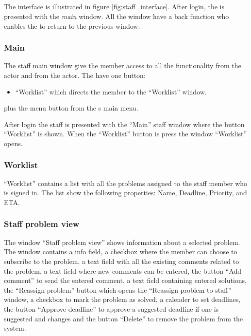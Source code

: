 
\subsection{\sinterface}
The \astaff interface is illustrated in figure \ref{fig:staff_interface}.
After login, the \astaff[] is presented with the \textit{main} window. All the window have a back function who enables the \astaff[] to return to the previous window.


\subsubsection{Main}
The staff main window give the \astaff member access to all the functionality from the \astaff actor and from the \aclient actor. The \astaff have one button:
\begin{itemize}
	\item ``Worklist'' which directs the \astaff member to the ``Worklist'' window. 
\end{itemize}   
plus the menu button from the \aclient s main menu.

 After login the staff is presented with the ``Main'' staff window where the button ``Worklist'' is shown. When the ``Worklist'' button is press the window ``Worklist'' opens. 


\subsubsection{Worklist}
``Worklist'' contains a list with all the problems assigned to the staff member who is signed in. The list show the following properties: Name, Deadline, Priority, and ETA.


\subsubsection{Staff problem view}
The window ``Staff problem view'' shows information about a selected problem. The window contains a info field, a checkbox where the \astaff member can choose to subscribe to the problem, a text field with all the existing comments related to the problem, a text field where new comments can be entered, the button ``Add comment'' to send the entered comment, a text field containing entered solutions, the ``Reassign problem'' button which opens the ``Reassign problem to staff'' window, a checkbox to mark the problem as solved, a calender to set deadlines, the button ``Approve deadline'' to approve a suggested deadline if one is suggested and changes and the button ``Delete'' to remove the problem from the system.   

